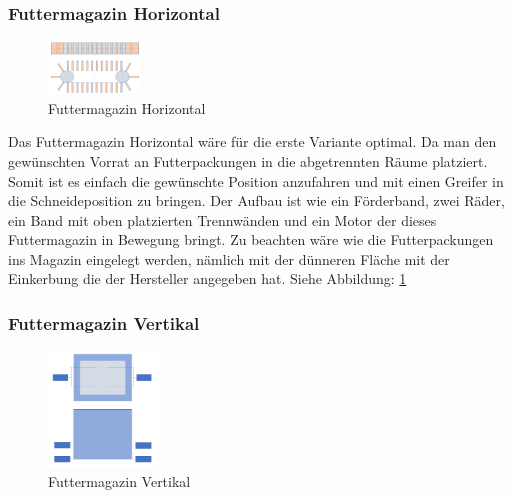 \subsubsection{Futtermagazin Horizontal}

\begin{figure}
\vspace{-40pt}
  \begin{center}
    \includegraphics[width=0.22\textwidth]{Bilder/Powerpoint/Futtermagazin_horizontal}
  \end{center}
  \caption{Futtermagazin Horizontal}
  \label{Magazin Horizontal}
  \vspace{-10pt}
\end{figure} 

Das Futtermagazin Horizontal wäre für die erste Variante optimal. Da man den gewünschten Vorrat an Futterpackungen in die abgetrennten Räume platziert. Somit ist es einfach die gewünschte Position anzufahren und mit einen Greifer in die Schneideposition zu bringen. Der Aufbau ist wie ein Förderband, zwei Räder, ein Band mit oben platzierten Trennwänden und ein Motor der dieses Futtermagazin in Bewegung bringt. Zu beachten wäre wie die Futterpackungen ins Magazin eingelegt werden, nämlich mit der dünneren Fläche mit der Einkerbung die der Hersteller angegeben hat. Siehe Abbildung: \ref{Magazin Horizontal}

\subsubsection{Futtermagazin Vertikal}

\begin{figure}
\vspace{-40pt}
  \begin{center}
    \includegraphics[width=0.26\textwidth]{Bilder/Powerpoint/Futtermagazin_vertikal}
  \end{center}
  \caption{Futtermagazin Vertikal}
  \label{Magazin Vertikal}
  \vspace{-10pt}
\end{figure}

